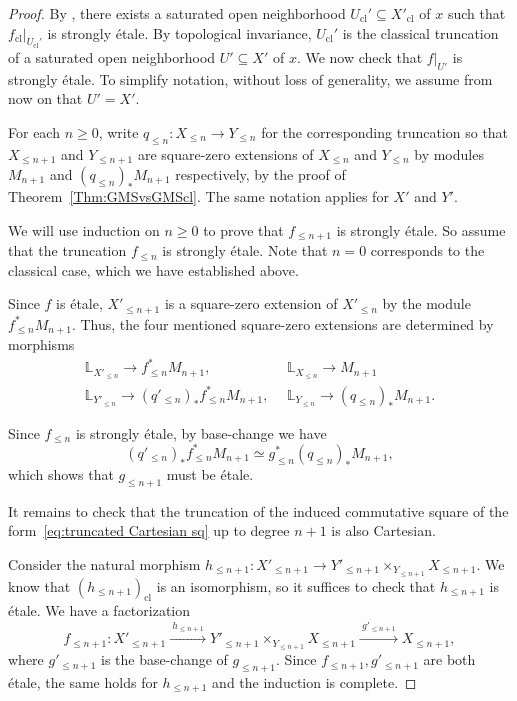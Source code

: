 \documentclass[a4paper,twoside,11pt]{amsart}
\theoremstyle{plain}
\theoremstyle{definition}
\theoremstyle{remark}
\numberwithin{equation}{section}
\newcommand{\cl}{\mathrm{cl}} %
\newcommand{\BL}{{\mathbb{L}}}
\begin{document}
\begin{proof}
    By \cite[Theorem~3.14]{AHR2}, there exists a saturated open neighborhood $U_\cl' \subseteq X'_\cl$ of $x$ such that $f_\cl|_{U_\cl'}$ is strongly \'{e}tale. By topological invariance, $U_\cl'$ is the classical truncation of a saturated open neighborhood $U' \subseteq X'$ of $x$. We now check that $f|_{U'}$ is strongly \'{e}tale. To simplify notation, without loss of generality, we assume from now on that $U' = X'$.

    For each $n \geq 0$, write $q_{\leq n} \colon X_{\leq n} \to Y_{\leq n}$ for the corresponding truncation so that $X_{\leq n+1}$ and $Y_{\leq n+1}$ are square-zero extensions of $X_{\leq n}$ and $Y_{\leq n}$ by modules $M_{n+1}$ and $(q_{\leq n})_\ast M_{n+1}$ respectively, by the proof of Theorem~\ref{Thm:GMSvsGMScl}. The same notation applies for $X'$ and $Y'$.

    We will use induction on $n \geq 0$ to prove that $f_{\leq n+1}$ is strongly \'{e}tale. So assume that the truncation $f_{\leq n}$ is strongly \'{e}tale. Note that $n=0$ corresponds to the classical case, which we have established above.

    Since $f$ is \'{e}tale, $X'_{\leq n+1}$ is a square-zero extension of $X'_{\leq n}$ by the module $f_{\leq n}^\ast M_{n+1}$. Thus, the four mentioned square-zero extensions are determined by morphisms
    \begin{align*}
        \BL_{X'_{\leq n}} \to f_{\leq n}^\ast M_{n+1}, \ \  & \BL_{X_{\leq n}} \to M_{n+1} \\
        \BL_{Y'_{\leq n}} \to (q'_{\leq n})_\ast f_{\leq n}^\ast M_{n+1}, \ \  & \BL_{Y_{\leq n}} \to (q_{\leq n})_\ast M_{n+1}. 
    \end{align*}

    Since $f_{\leq n}$ is strongly \'{e}tale, by base-change we have $$(q'_{\leq n})_\ast f_{\leq n}^\ast M_{n+1} \simeq g_{\leq n}^\ast (q_{\leq n})_\ast M_{n+1},$$
    which shows that $g_{\leq n+1}$ must be \'{e}tale.

    It remains to check that the truncation of the induced commutative square of the form~\eqref{eq:truncated Cartesian sq} up to degree $n+1$ is also Cartesian. 

    Consider the natural morphism $h_{\leq n+1} \colon X'_{\leq n+1} \to Y'_{\leq n+1} \times_{Y_{\leq n+1}} X_{\leq n+1}$. We know that $(h_{\leq n+1})_\cl$ is an isomorphism, so it suffices to check that $h_{\leq n+1}$ is \'{e}tale. We have a factorization 
    $$ f_{\leq n+1} \colon X'_{\leq n+1} \xrightarrow{ \ h_{\leq n+1} \ } Y'_{\leq n+1} \times_{Y_{\leq n+1}} X_{\leq n+1} \xrightarrow{ \ g'_{\leq n+1} \ } X_{\leq n+1},$$
    where $g'_{\leq n+1}$ is the base-change of $g_{\leq n+1}$. Since $f_{\leq n+1}, g'_{\leq n+1} $ are both \'{e}tale, the same holds for $h_{\leq n+1}$ and the induction is complete.


\end{proof}
\end{document}

